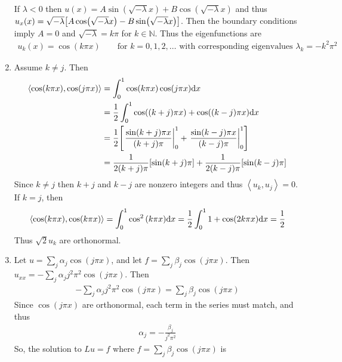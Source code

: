 \documentclass{article} %
\theoremstyle{plain}
\numberwithin{equation}{section} %
\numberwithin{figure}{section} %
\numberwithin{table}{section} %
\begin{document}
\begin{enumerate}[\ \ (a)]
        If $\lambda < 0$ then $u(x) = A\sin(\sqrt{-\lambda}x) + B\cos(\sqrt{-\lambda}x)$ and thus $u_x(x) = \sqrt{-\lambda}\qty[A\cos(\sqrt{-\lambda}x) - B\sin(\sqrt{-\lambda}x)]$.  Then the boundary conditions imply $A = 0$ and $\sqrt{-\lambda} = k\pi$ for $k \in \mathbb{N}$.  Thus the eigenfunctions are
        \begin{align*}
            u_k(x) = \cos(k\pi x) \qquad \text{for $k = 0, 1, 2, \dots$ with corresponding eigenvalues } \lambda_k = -k^2\pi^2
        \end{align*}
    \item
        Assume $k \neq j$.  Then
        \begin{align*}
            \left\langle \cos(k \pi x), \cos(j \pi x) \right\rangle &= \int_0^1\cos(k\pi x)\cos(j\pi x)\dd x \\
            &= \frac{1}{2}\int_0^1\cos((k+j)\pi x) + \cos((k-j)\pi x)\dd x \\
            &= \frac{1}{2}\qty[\left.\frac{\sin(k+j)\pi x}{(k+j)\pi}\right|_0^1 + \left.\frac{\sin(k-j)\pi x}{(k-j)\pi}\right|_0^1] \\
            &= \frac{1}{2(k+j)\pi}\qty[\sin(k+j)\pi] + \frac{1}{2(k-j)\pi}\qty[\sin(k-j)\pi]
        \end{align*}
        Since $k \neq j$ then $k+j$ and $k-j$ are nonzero integers and thus $\left\langle u_k, u_j\right\rangle = 0$.  If $k = j$, then
        \begin{align*}
            \left\langle \cos(k\pi x), \cos(k\pi x)\right\rangle = \int_0^1\cos^2\qty(k\pi x)\dd x = \frac{1}{2}\int_0^1 1 + \cos(2k\pi x)\dd x = \frac{1}{2}
        \end{align*}
        Thus $\sqrt{2}u_k$ are orthonormal.
    \item
        Let $u = \displaystyle\sum_j \alpha_j\cos(j\pi x)$, and let $f = \displaystyle\sum_j \beta_j\cos(j\pi x)$.  Then $u_{xx} = -\displaystyle\sum_j \alpha_jj^2\pi^2\cos(j\pi x)$.  Then
        \begin{align*}
            -\sum_j\alpha_j j^2\pi^2\cos(j\pi x) = \sum_j \beta_j\cos(j\pi x)
        \end{align*}
        Since $\cos(j\pi x)$ are orthonormal, each term in the series must match, and thus
        \begin{align*}
            \alpha_j = -\frac{\beta_j}{j^2\pi^2}
        \end{align*}
        So, the solution to $Lu = f$ where $f = \displaystyle\sum_j \beta_j \cos(j\pi x)$ is
        \begin{align*}

\end{align*}
\end{enumerate}
\end{document}

